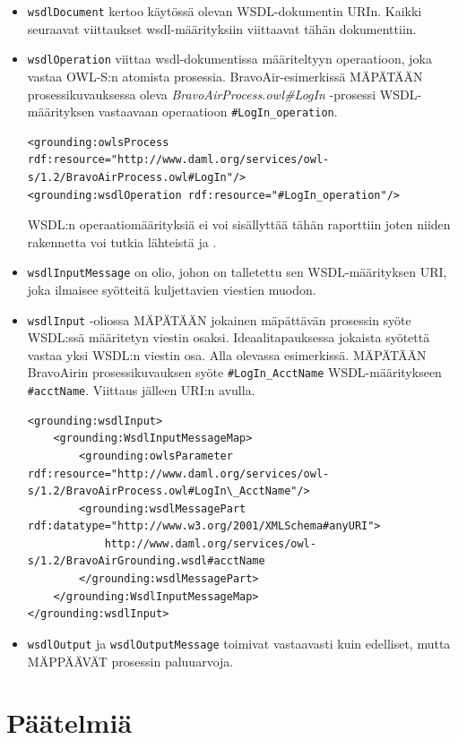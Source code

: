 \documentclass[finnish]{tktltiki2}
\theoremstyle{definition}
\theoremstyle{remark}
\begin{document}
\begin{itemize}
\item \texttt{wsdlDocument} kertoo käytössä olevan WSDL-dokumentin URIn. Kaikki seuraavat viittaukset wsdl-määrityksiin viittaavat tähän dokumenttiin. 

\item \texttt{wsdlOperation} viittaa wsdl-dokumentissa määriteltyyn operaatioon, joka vastaa OWL-S:n  atomista prosessia. BravoAir-esimerkissä MÄPÄTÄÄN 
prosessikuvauksessa oleva \textit{BravoAirProcess.owl\#LogIn} -prosessi WSDL-määrityksen vastaavaan operaatioon \texttt{\#LogIn\_operation}. 

\begin{verbatim}
<grounding:owlsProcess rdf:resource="http://www.daml.org/services/owl-s/1.2/BravoAirProcess.owl#LogIn"/>
<grounding:wsdlOperation rdf:resource="#LogIn_operation"/>
\end{verbatim}

WSDL:n operaatiomäärityksiä ei voi sisällyttää tähän raporttiin joten niiden rakennetta voi tutkia lähteistä \cite{daml} ja \cite{WSDL}. 

\item \texttt{wsdlInputMessage} on olio, johon on talletettu sen  WSDL-määrityksen URI, joka ilmaisee syötteitä kuljettavien viestien muodon.  

\item \texttt{wsdlInput} -oliossa MÄPÄTÄÄN jokainen mäpättävän prosessin syöte WSDL:ssä  määritetyn viestin osaksi. Ideaalitapauksessa jokaista syötettä vastaa yksi WSDL:n viestin osa. Alla olevassa esimerkissä. MÄPÄTÄÄN BravoAirin prosessikuvauksen syöte \texttt{\#LogIn\_AcctName} WSDL-määritykseen  \texttt{\#acctName}. Viittaus jälleen URI:n avulla. 
\begin{verbatim}
<grounding:wsdlInput>
    <grounding:WsdlInputMessageMap>
        <grounding:owlsParameter rdf:resource="http://www.daml.org/services/owl-s/1.2/BravoAirProcess.owl#LogIn\_AcctName"/>
        <grounding:wsdlMessagePart rdf:datatype="http://www.w3.org/2001/XMLSchema#anyURI">
            http://www.daml.org/services/owl-s/1.2/BravoAirGrounding.wsdl#acctName
        </grounding:wsdlMessagePart>
    </grounding:WsdlInputMessageMap>
</grounding:wsdlInput>
\end{verbatim}

\item \texttt{wsdlOutput} ja \texttt{wsdlOutputMessage} toimivat vastaavasti kuin edelliset, mutta MÄPPÄÄVÄT prosessin paluuarvoja.
\end{itemize}

\section{Päätelmiä}




%
%
% 
%



\end{document}
